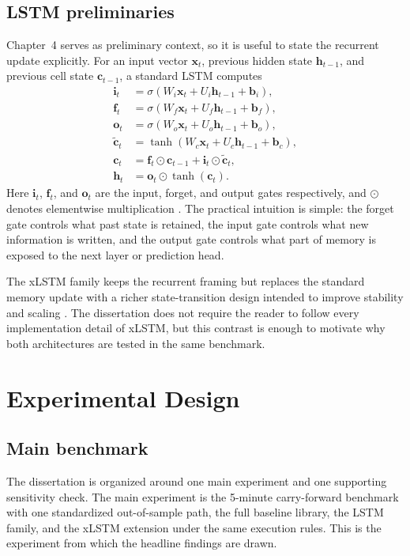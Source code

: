\documentclass[12pt]{report}
\begin{document}
\section{LSTM preliminaries}
Chapter~4 serves as preliminary context, so it is useful to state the recurrent update explicitly. For an input vector \(\mathbf{x}_t\), previous hidden state \(\mathbf{h}_{t-1}\), and previous cell state \(\mathbf{c}_{t-1}\), a standard LSTM computes
\begin{align}
\mathbf{i}_t &= \sigma\!\left(W_i \mathbf{x}_t + U_i \mathbf{h}_{t-1} + \mathbf{b}_i\right), \\
\mathbf{f}_t &= \sigma\!\left(W_f \mathbf{x}_t + U_f \mathbf{h}_{t-1} + \mathbf{b}_f\right), \\
\mathbf{o}_t &= \sigma\!\left(W_o \mathbf{x}_t + U_o \mathbf{h}_{t-1} + \mathbf{b}_o\right), \\
\tilde{\mathbf{c}}_t &= \tanh\!\left(W_c \mathbf{x}_t + U_c \mathbf{h}_{t-1} + \mathbf{b}_c\right), \\
\mathbf{c}_t &= \mathbf{f}_t \odot \mathbf{c}_{t-1} + \mathbf{i}_t \odot \tilde{\mathbf{c}}_t, \\
\mathbf{h}_t &= \mathbf{o}_t \odot \tanh\!\left(\mathbf{c}_t\right).
\end{align}
Here \(\mathbf{i}_t\), \(\mathbf{f}_t\), and \(\mathbf{o}_t\) are the input, forget, and output gates respectively, and \(\odot\) denotes elementwise multiplication \citep{hochreiter1997}. The practical intuition is simple: the forget gate controls what past state is retained, the input gate controls what new information is written, and the output gate controls what part of memory is exposed to the next layer or prediction head.

The xLSTM family keeps the recurrent framing but replaces the standard memory update with a richer state-transition design intended to improve stability and scaling \citep{beck2024xlstm}. The dissertation does not require the reader to follow every implementation detail of xLSTM, but this contrast is enough to motivate why both architectures are tested in the same benchmark.

\chapter{Experimental Design}

\section{Main benchmark}
The dissertation is organized around one main experiment and one supporting sensitivity check. The main experiment is the 5-minute carry-forward benchmark with one standardized out-of-sample path, the full baseline library, the LSTM family, and the xLSTM extension under the same execution rules. This is the experiment from which the headline findings are drawn.
\end{document}
